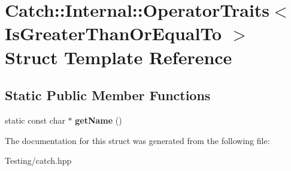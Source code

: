\hypertarget{struct_catch_1_1_internal_1_1_operator_traits_3_01_is_greater_than_or_equal_to_01_4}{\section{Catch\-:\-:Internal\-:\-:Operator\-Traits$<$ Is\-Greater\-Than\-Or\-Equal\-To $>$ Struct Template Reference}
\label{struct_catch_1_1_internal_1_1_operator_traits_3_01_is_greater_than_or_equal_to_01_4}
}
\subsection*{Static Public Member Functions}
\begin{DoxyCompactItemize}
\item 
\hypertarget{struct_catch_1_1_internal_1_1_operator_traits_3_01_is_greater_than_or_equal_to_01_4_a76b6f6b0dbaf7d19ebb1b4b4891e719e}{static const char $\ast$ {\bfseries get\-Name} ()}\label{struct_catch_1_1_internal_1_1_operator_traits_3_01_is_greater_than_or_equal_to_01_4_a76b6f6b0dbaf7d19ebb1b4b4891e719e}

\end{DoxyCompactItemize}


The documentation for this struct was generated from the following file\-:\begin{DoxyCompactItemize}
\item 
Testing/catch.\-hpp\end{DoxyCompactItemize}
